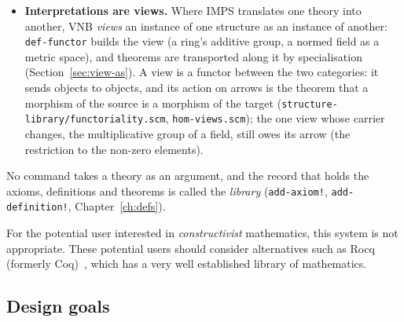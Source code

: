 \begin{itemize}
  Essential smallness is the reason VNB has no universe axiom.  Some systems
  extend set theory with Grothendieck universes, or adopt Tarski--Grothendieck
  set theory, so that a category of all groups or of all metric spaces can be
  a set.  For an essentially small category this is unnecessary.  A statement about
  all models up to isomorphism quantifies over the set of representatives,
  which the quantifiers reach; only a statement about the class itself is out
  of reach, and none of the mathematics formalized so far has needed one.

\item \textbf{Interpretations are views.}  Where IMPS translates one theory into
  another, VNB \emph{views} an instance of one structure as an instance of
  another: \texttt{def-functor} builds the view (a ring's additive group, a
  normed field as a metric space), and theorems are transported along it by
  specialisation (Section~\ref{sec:view-as}).  A view is a functor between the
  two categories: it sends objects to objects, and its action on arrows is the
  theorem that a morphism of the source is a morphism of the target
  (\texttt{structure-library/functoriality.scm}, \texttt{hom-views.scm}); the one
  view whose carrier changes, the multiplicative group of a field, still owes its
  arrow (the restriction to the non-zero elements).
\end{itemize}

No command takes a theory as an argument, and the record that holds the axioms,
definitions and theorems is called the \emph{library}
(\texttt{add-axiom!}, \texttt{add-definition!}, Chapter~\ref{ch:defs}).

\begin{remark}\label{remark:27137-61828-986360}
%
For the potential user interested in \emph{constructivist} mathematics,
this system is not appropriate. These potential users should consider
alternatives such as Rocq (formerly Coq)~\cite{Rocq}, which has a very well established library of
mathematics.
%
\end{remark}

\subsection{Design goals}

